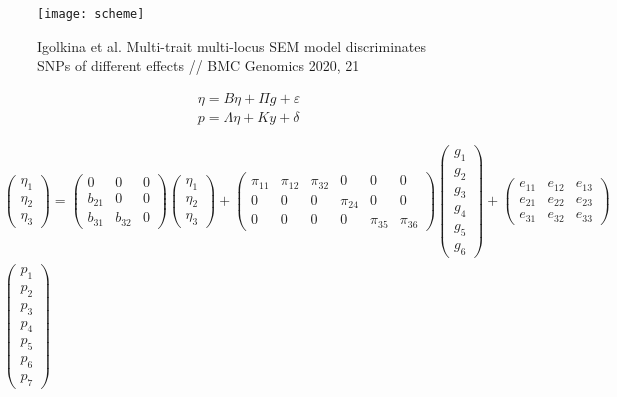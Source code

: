 \documentclass[a4paper,12pt]{article}
\begin{document}
\begin{figure}[H]
    \texttt{[image: scheme]}
    \caption{Igolkina et al. Multi-trait multi-locus SEM model
        discriminates SNPs of different effects // BMC Genomics 2020, 21}
\end{figure}

\begin{gather*}
	\eta = B \eta + \Pi g + \varepsilon \\
	p = \Lambda \eta + K y + \delta
\end{gather*}

\begin{gather*}
\begin{pmatrix}
	\eta_1 \\
	\eta_2 \\
	\eta_3
\end{pmatrix} =
 \begin{pmatrix}
 	0 & 0 & 0 \\
 	b_{21} & 0 & 0 \\
 	b_{31} & b_{32} & 0
 \end{pmatrix}
\begin{pmatrix}
	\eta_1 \\
	\eta_2 \\
	\eta_3
\end{pmatrix} +
\begin{pmatrix}
	\pi_{11} & \pi_{12} & \pi_{32} & 0 & 0 & 0 \\
	0 & 0 & 0 & \pi_{24} & 0 & 0 \\
	0 & 0 & 0 & 0 & \pi_{35} & \pi_{36}
\end{pmatrix}
\begin{pmatrix}
	g_1 \\ g_2 \\ g_3 \\ g_4 \\ g_5 \\ g_6
\end{pmatrix} +
\begin{pmatrix}
	e_{11} & e_{12} & e_{13} \\
	e_{21} & e_{22} & e_{23} \\
	e_{31} & e_{32} & e_{33}
\end{pmatrix} \\
\begin{pmatrix}
	p_1 \\ p_2 \\ p_3 \\ p_4 \\ p_5 \\ p_6 \\ p_7

\end{pmatrix}
\end{gather*}
\end{document}
